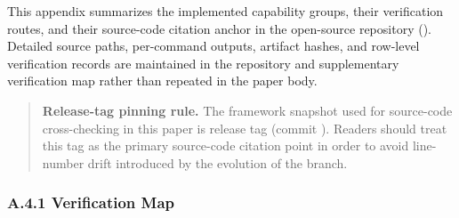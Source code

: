 \documentclass[9pt,letterpaper]{extarticle}
\begin{document}
This appendix summarizes the implemented capability groups, their verification routes, and their source-code citation anchor in the open-source repository (\texttt{}). Detailed source paths, per-command outputs, artifact hashes, and row-level verification records are maintained in the repository and supplementary verification map rather than repeated in the paper body.

\begin{quote}
\textbf{Release-tag pinning rule.} The framework snapshot used for source-code cross-checking in this paper is release tag \texttt{} (commit \texttt{}). Readers should treat this tag as the primary source-code citation point in order to avoid line-number drift introduced by the evolution of the \texttt{} branch.
\end{quote}

\subsubsection*{A.4.1 Verification Map}
\end{document}
